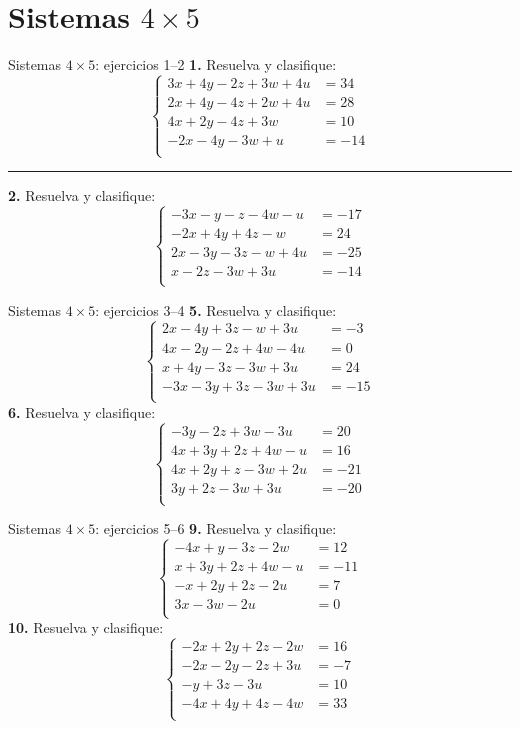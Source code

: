\documentclass[aspectratio=169]{beamer}
\begin{document}
\section{Sistemas $4\times 5$}
\begin{frame}{Sistemas $4\times 5$: ejercicios 1--2}
\scriptsize
\textbf{1.} Resuelva y clasifique:
\[\left\{\begin{aligned}
3x+4y-2z+3w+4u&=34\\
2x+4y-4z+2w+4u&=28\\
4x+2y-4z+3w&=10\\
-2x-4y-3w+u&=-14\\
\end{aligned}\right.\]
\vspace{0.2em}\hrule\vspace{0.3em}
\textbf{2.} Resuelva y clasifique:
\[\left\{\begin{aligned}
-3x-y-z-4w-u&=-17\\
-2x+4y+4z-w&=24\\
2x-3y-3z-w+4u&=-25\\
x-2z-3w+3u&=-14\\
\end{aligned}\right.\]
\end{frame}
\begin{frame}{Sistemas $4\times 5$: ejercicios 3--4}
\scriptsize
\textbf{5.} Resuelva y clasifique:
\[\left\{\begin{aligned}
2x-4y+3z-w+3u&=-3\\
4x-2y-2z+4w-4u&=0\\
x+4y-3z-3w+3u&=24\\
-3x-3y+3z-3w+3u&=-15\\
\end{aligned}\right.\]
\textbf{6.} Resuelva y clasifique:
\[\left\{\begin{aligned}
-3y-2z+3w-3u&=20\\
4x+3y+2z+4w-u&=16\\
4x+2y+z-3w+2u&=-21\\
3y+2z-3w+3u&=-20\\
\end{aligned}\right.\]
\end{frame}
\begin{frame}{Sistemas $4\times 5$: ejercicios 5--6}
\scriptsize
\textbf{9.} Resuelva y clasifique:
\[\left\{\begin{aligned}
-4x+y-3z-2w&=12\\
x+3y+2z+4w-u&=-11\\
-x+2y+2z-2u&=7\\
3x-3w-2u&=0\\
\end{aligned}\right.\]
\textbf{10.} Resuelva y clasifique:
\[\left\{\begin{aligned}
-2x+2y+2z-2w&=16\\
-2x-2y-2z+3u&=-7\\
-y+3z-3u&=10\\
-4x+4y+4z-4w&=33\\
\end{aligned}\right.\]
\end{frame}
\end{document}
